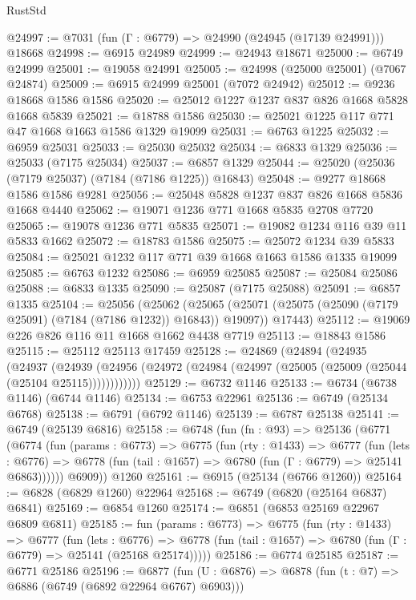\begin{lexlean}{RustStd}
\begin{coremodule}
@24997 := @7031 (fun (Γ : @6779) => @24990 (@24945 (@17139 @24991))) @18668
@24998 := @6915 @24989
@24999 := @24943 @18671
@25000 := @6749 @24999
@25001 := @19058 @24991
@25005 := @24998 (@25000 @25001) (@7067 @24874)
@25009 := @6915 @24999 @25001 (@7072 @24942)
@25012 := @9236 @18668 @1586 @1586
@25020 := @25012 @1227 @1237 @837 @826 @1668 @5828 @1668 @5839
@25021 := @18788 @1586
@25030 := @25021 @1225 @117 @771 @47 @1668 @1663 @1586 @1329 @19099
@25031 := @6763 @1225
@25032 := @6959 @25031
@25033 := @25030 @25032
@25034 := @6833 @1329
@25036 := @25033 (@7175 @25034)
@25037 := @6857 @1329
@25044 := @25020 (@25036 (@7179 @25037) (@7184 (@7186 @1225)) @16843)
@25048 := @9277 @18668 @1586 @1586 @9281
@25056 := @25048 @5828 @1237 @837 @826 @1668 @5836 @1668 @4440
@25062 := @19071 @1236 @771 @1668 @5835 @2708 @7720
@25065 := @19078 @1236 @771 @5835
@25071 := @19082 @1234 @116 @39 @11 @5833 @1662
@25072 := @18783 @1586
@25075 := @25072 @1234 @39 @5833
@25084 := @25021 @1232 @117 @771 @39 @1668 @1663 @1586 @1335 @19099
@25085 := @6763 @1232
@25086 := @6959 @25085
@25087 := @25084 @25086
@25088 := @6833 @1335
@25090 := @25087 (@7175 @25088)
@25091 := @6857 @1335
@25104 := @25056
    (@25062
      (@25065 (@25071 (@25075 (@25090 (@7179 @25091) (@7184 (@7186 @1232)) @16843)) @19097))
      @17443)
@25112 := @19069 @226 @826 @116 @11 @1668 @1662 @4438 @7719
@25113 := @18843 @1586
@25115 := @25112 @25113 @17459
@25128 := @24869
    (@24894
      (@24935
        (@24937
          (@24939 (@24956 (@24972 (@24984 (@24997 (@25005 (@25009 (@25044 (@25104 @25115))))))))))))
@25129 := @6732 @1146
@25133 := @6734 (@6738 @1146) (@6744 @1146)
@25134 := @6753 @22961
@25136 := @6749 (@25134 @6768)
@25138 := @6791 (@6792 @1146)
@25139 := @6787 @25138
@25141 := @6749 (@25139 @6816)
@25158 := @6748
    (fun (fn : @93) =>
    @25136
      (@6771
        (@6774
          (fun (params : @6773) =>
          @6775
            (fun (rty : @1433) =>
            @6777
              (fun (lets : @6776) =>
              @6778 (fun (tail : @1657) => @6780 (fun (Γ : @6779) => @25141 @6863))))))
        @6909))
    @1260
@25161 := @6915 (@25134 (@6766 @1260))
@25164 := @6828 (@6829 @1260) @22964
@25168 := @6749 (@6820 (@25164 @6837) @6841)
@25169 := @6854 @1260
@25174 := @6851 (@6853 @25169 @22967 @6809 @6811)
@25185 := fun (params : @6773) =>
  @6775
    (fun (rty : @1433) =>
    @6777
      (fun (lets : @6776) =>
      @6778 (fun (tail : @1657) => @6780 (fun (Γ : @6779) => @25141 (@25168 @25174)))))
@25186 := @6774 @25185
@25187 := @6771 @25186
@25196 := @6877
    (fun (U : @6876) => @6878 (fun (t : @7) => @6886 (@6749 (@6892 @22964 @6767) @6903)))

\end{coremodule}
\end{lexlean}
